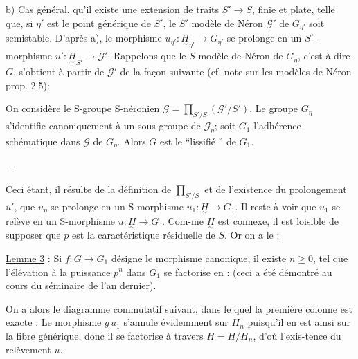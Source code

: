 b) Cas général.
qu'il existe une extension de traits $S'\longrightarrow S$, finie et plate, telle que, si $\eta'$ est le point générique de $S'$, le $S'$ modèle de Néron $\mathcal G'$ de $G_{\eta'}$ soit semi\inserted{-}stable. D'après a), le morphisme $u_{\eta'}:\underset{\sim}{H}_{\eta'}\longrightarrow G_{\eta'}$ se prolonge en un $S'$-morphisme $u':\underset{\sim}{H}_{S'}\longrightarrow\mathcal G'$. Rappelons que le $S$-modèle de Néron de $G_\eta$, c'est à dire $G$, s'obtient à partir de $\mathcal G'$ de la façon suivante (cf. note sur les modèles de Néron prop. 2.5):

On considère le S-groupe S-néronien $\mathcal G=\prod_{S'/S}(\mathcal G'/S')$. Le groupe $G_\eta$ s'identifie canoniquement à un sous-groupe de $\mathcal G_\eta$; soit $G_1$ l'adhérence schématique dans $\mathcal G$ de $G_\eta$. Alors $G$ est le ``lissifié '' de $G_1$.


-  -

Ceci étant, il résulte de la définition de $\prod_{S'/S}$ et de l'existence du prolongement $u'$, que $u_\eta$ se prolonge en un S-morphisme $u_1:\underset{\sim}{H}\longrightarrow G_1$. Il reste à voir que $u_1$ se relève en un S-morphisme $u:\underset{\sim}{H}\longrightarrow G$ . Com-me $\underset{\sim}{H}$ est connexe, il est loisible de supposer que $p$ est la caractéristique résiduelle de $S$. Or on a le :

\uline{Lemme 3} : Si $f:G\longrightarrow G_1$ désigne le morphisme canonique,  il existe $n\geq0$, tel que l'élévation à la puissance $p^n$ dans $G_1$ se factorise en :
(ceci a été démontré au cours du séminaire de l'an dernier).

On a alors le diagramme commutatif suivant, dans le quel la première colonne est exacte :
Le morphisme $g\,u_1$ s'annule évidemment sur $H_n$ puisqu'il en est ainsi sur la fibre générique, donc il se factorise à travers $H=H/H_n$, d'où l'exis-tence du relèvement $u$.

